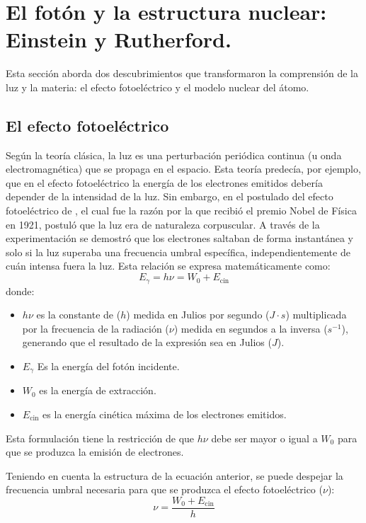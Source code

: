 \documentclass[11pt,a4paper,spanish]{book}
\begin{document}
\section{El fotón y la estructura nuclear: Einstein y Rutherford.}
Esta sección aborda dos descubrimientos que transformaron la
comprensión de la luz y la materia: el efecto fotoeléctrico y el
modelo nuclear del átomo.

\subsection{El efecto fotoeléctrico}
Según la teoría clásica, la luz es una perturbación periódica
continua (u onda electromagnética) que se propaga en el espacio. Esta
teoría predecía, por ejemplo, que en el efecto fotoeléctrico la
energía de los electrones emitidos debería depender de la intensidad de la luz.
Sin embargo, en el postulado del efecto fotoeléctrico de
\citet{einsteina1905_photoelectric},
el cual fue la razón por la que recibió el premio Nobel de Física en
1921, postuló que la luz era de
naturaleza corpuscular. A través de la experimentación se demostró que los
electrones saltaban de forma instantánea y solo si la luz superaba
una frecuencia umbral específica, independientemente de cuán intensa
fuera la luz. Esta relación se expresa matemáticamente como:
\begin{equation}
  E_{\gamma} = h\nu = W_0 + E_{\text{cin}}
\end{equation}
donde:
\begin{itemize}[nosep]
  \item $h\nu$ es la constante de \citet{planck1900} ($h$) medida en Julios por
    segundo ($J \cdot s$) multiplicada por la frecuencia de la
    radiación ($\nu$) medida en segundos a la inversa ($s^{-1}$),
    generando que el resultado de la expresión sea en Julios ($J$).
  \item $E_{\gamma}$ Es la energía del fotón incidente.
  \item $W_0$ es la energía de extracción.
  \item $E_{\text{cin}}$ es la energía cinética máxima de los
    electrones emitidos.
\end{itemize}
Esta formulación tiene la restricción de que $h\nu$ debe ser mayor
o igual a $W_0$ para que se produzca la emisión de electrones.

Teniendo en cuenta la estructura de la ecuación anterior, se puede
despejar la frecuencia umbral necesaria
para que se produzca el
efecto fotoeléctrico ($\nu$):
\begin{equation}
  \nu = \frac{W_0 + E_{\text{cin}}}{h}
\end{equation}
\end{document}
